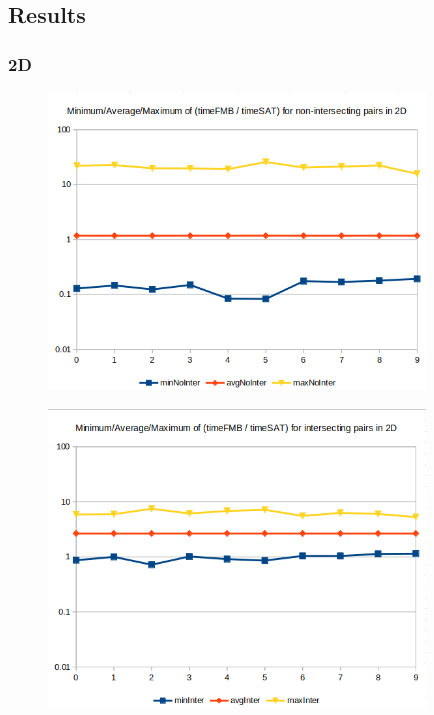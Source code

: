 \documentclass[12pt, a4paper]{article}
\begin{document}
\subsection{Results}

\subsubsection{2D}

\begin{center}
\begin{figure}[H]
\centering\includegraphics[width=10cm]{./2dnointer.png}\\
\end{figure}
\end{center}

\begin{center}
\begin{figure}[H]
\centering\includegraphics[width=10cm]{./2dinter.png}\\
\end{figure}
\end{center}
\end{document}
